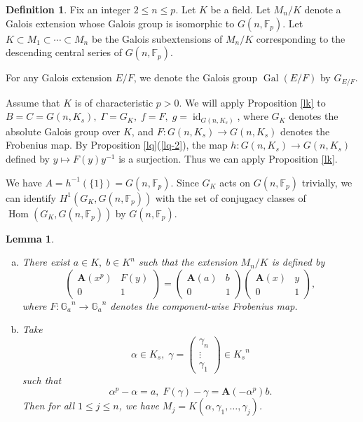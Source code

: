 \documentclass[sn-mathphys-num]{sn-jnl}
\numberwithin{equation}{section}
\newcommand{\Gal}{\operatorname{Gal}}
\theoremstyle{plain}
\newtheorem{lemm}[theo]{Lemma}
\theoremstyle{definition}
\newtheorem{defi}[theo]{Definition}
\begin{document}
\begin{defi}\label{dfd}
  Fix an integer $2\leq n\leq p$. Let $K$ be a field. Let $M_n/K$ denote a Galois extension whose Galois group is isomorphic to $G(n,\mathbb{F}_p)$. Let $K\subset M_1\subset\cdots\subset M_n$ be the Galois subextensions of $M_n/K$ corresponding to the descending central series of $G(n,\mathbb{F}_p)$.
  \end{defi}

  For any Galois extension $E/F$, we denote the Galois group $\Gal(E/F)$ by $G_{E/F}$. 

Assume that $K$ is of characteristic $p>0$. We will apply Proposition \ref{lk} to $B=C=G(n,K_s),\;\Gamma=G_K,\;f=F,\;g=\operatorname{id}_{G(n,K_s)}$, where $G_K$ denotes the absolute Galois group over $K$, and $F:G(n,K_s)\to G(n,K_s)$ denotes the Frobenius map.  By Proposition \ref{lq}(\ref{lq-2}), the map $h:G(n,K_s)\to G(n,K_s)$ defined by $y\mapsto F(y)y^{-1}$ is a surjection. Thus we can apply Proposition \ref{lk}.

We have $A=h^{-1}(\{1\})=G(n,\mathbb{F}_p)$. Since $G_K$ acts on $G(n,\mathbb{F}_p)$ trivially, we can identify $H^1(G_K,G(n,\mathbb{F}_p))$ with the set of conjugacy classes of $\operatorname{Hom}(G_K,G(n,\mathbb{F}_p))$ by $G(n,\mathbb{F}_p)$. 
  
\begin{lemm}\label{lag}
  \begin{enumerate}[(a)]
    \item\label{lag-1} There exist $a\in K,\;b\in K^{n}$ such that the extension $M_n/K$ is defined by 
\begin{equation}\label{ea}
\begin{pmatrix}
  \mathbf{A}(x^p)&F(y)\\
  0&1
\end{pmatrix}
=
\begin{pmatrix}
  \mathbf{A}(a)&b\\
  0&1
\end{pmatrix}
\begin{pmatrix}
  \mathbf{A}(x)&y\\
  0&1
\end{pmatrix},
\end{equation}
where $F:{\mathbb{G}_a}^n\to{\mathbb{G}_a}^n$ denotes the component-wise Frobenius map.
\item\label{lag-2} Take
  \begin{equation}
  \alpha\in K_s,\;\gamma=\begin{pmatrix}
    \gamma_n\\
    \vdots\\
    \gamma_1
\end{pmatrix}\in {K_s}^n
  \end{equation}
  such that
\begin{equation}
\alpha^p-\alpha=a,\;F(\gamma)-\gamma=\mathbf{A}(-\alpha^p)b.
    \end{equation}
    Then for all $1\leq j\leq n$, we have $M_j=K(\alpha,\gamma_1,\ldots,\gamma_j)$.
    \end{enumerate}
  \end{lemm}
\end{document}
